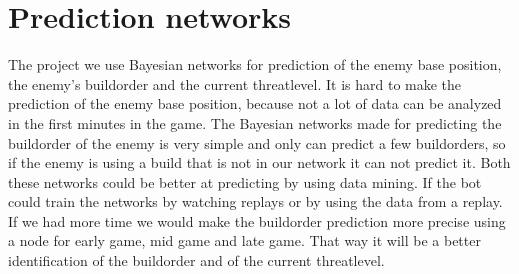 \section{Prediction networks}
	The project we use Bayesian networks for prediction of the enemy base position, the enemy's buildorder and the current threatlevel. 
	It is hard to make the prediction of the enemy base position, because not a lot of data can be analyzed in the first minutes in the game. 
	The Bayesian networks made for predicting the buildorder of the enemy is very simple and only can predict a few buildorders, so if the enemy is 
	using a build that is not in our network it can not predict it. Both these networks could be better at predicting by using data mining. If the 
	bot could train the networks by watching replays or by using the data from a replay. If we had more time we would make the buildorder prediction 
	more precise using a node for early game, mid game and late game. That way it will be a better identification of the buildorder and of the current 
	threatlevel.